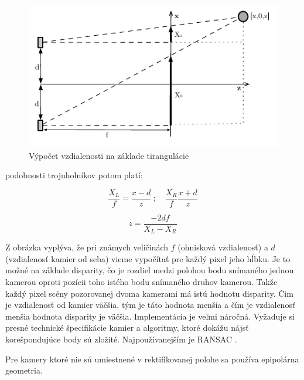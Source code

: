 \begin{figure}[H]
\begin{center}
	\includegraphics[scale=1.8]{images/stereoscope}
	\caption{Výpočet vzdialenosti na základe tirangulácie}
	\end{center}
\end{figure}

podobnosti trojuholníkov potom platí:


\begin{figure}[H]
    \centering
    \begin{minipage}[b]{0.49\textwidth}
        $$\frac{X_L}{f}=\frac{x-d}{z}\ {;}\quad \frac{X_R}{f}\frac{x+d}{z}$$ 
    \end{minipage}
    \hfill
    \begin{minipage}[b]{0.49\textwidth}
       $$ z=\frac{-2df}{X_L-X_R}$$
    \end{minipage}
\end{figure}



Z obrázka vyplýva, že pri známych veličinách $f$ (ohnisková vzdialenosť) a $d$ (vzdialenosť kamier od seba) vieme vypočítať pre každý pixel jeho hĺbku. Je to možné na základe disparity, čo je rozdiel medzi polohou bodu snímaného jednou kamerou oproti pozícii toho istého bodu snímaného druhov kamerou. Takže každý pixel scény pozorovanej dvoma kamerami má istú hodnotu disparity. Čim je vzdialenosť od kamier väčšia, tým je táto hodnota menšia a čím je vzdialenosť menšia hodnota disparity je väčšia. Implementácia je veľmi náročná. Vyžaduje si presné technické špecifikácie kamier a algoritmy, ktoré dokážu nájsť korešpondujúce body sú zložité. Najpoužívanejším je RANSAC \cite{pocitacove_videnie_v_praxi}. 

Pre kamery ktoré nie sú umiestnené v rektifikovanej  polohe sa používa epipolárna geometria. 


